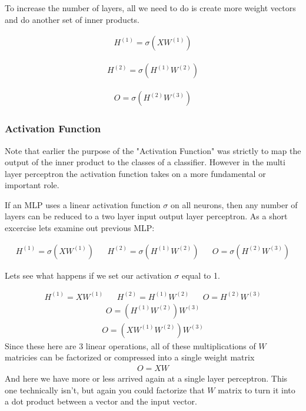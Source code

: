 \documentclass{article}
\begin{document}
To increase the number of layers, all we need to do is create more weight vectors and do another set of inner products.

\begin{align*}
H^{(1)} = \sigma(XW^{(1)}) 
\end{align*}

\begin{align*}
H^{(2)} = \sigma(H^{(1)}W^{(2)})
\end{align*}

\begin{align*}
O = \sigma(H^{(2)}W^{(3)}) 
\end{align*}

\subsubsection{Activation Function}
Note that earlier the purpose of the "Activation Function" was strictly to map the output of the inner product to the classes of a classifier. However in the multi layer perceptron the activation function takes on a more fundamental or important role.

If an MLP uses a linear activation function $\sigma$ on all neurons, then any number of layers can be reduced to a two layer input output layer perceptron. As a short excercise lets examine out previous MLP:

\begin{align*}
H^{(1)} = \sigma(XW^{(1)})  && H^{(2)} = \sigma(H^{(1)}W^{(2)}) && O = \sigma(H^{(2)}W^{(3)}) 
\end{align*}

Lets see what happens if we set our activation $\sigma$ equal to 1.

\begin{align*}
H^{(1)} = XW^{(1)}  && H^{(2)} = H^{(1)}W^{(2)} && O = H^{(2)}W^{(3)} 
\end{align*}
\begin{align*}
O = (H^{(1)}W^{(2)}) W^{(3)}
\end{align*}
\begin{align*}
O = (XW^{(1)} W^{(2)}) W^{(3)}
\end{align*}
Since these here are 3 linear operations, all of these multiplications of $W$ matricies can be factorized or compressed into a single weight matrix
\begin{align*}
O = X W
\end{align*}
And here we have more or less arrived again at a single layer perceptron. This one technically isn't, but again you could factorize that $W$ matrix to turn it into a dot product between a vector and the input vector.
\end{document}
